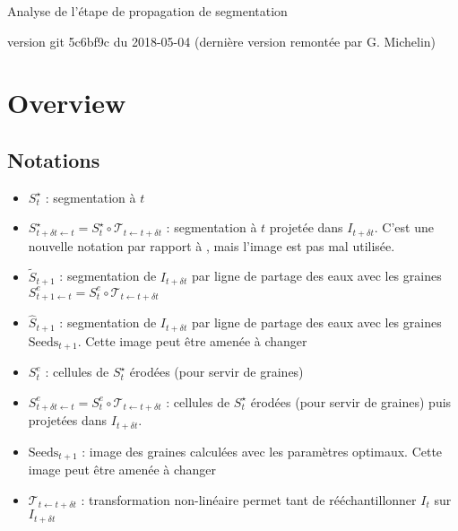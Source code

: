 \documentclass{article}
\begin{document}
Analyse de l'\'etape de propagation de segmentation

version git 5c6bf9c du 2018-05-04 (derni\`ere version remont\'ee par G. Michelin)





\tableofcontents





\pagebreak
\section{Overview}

\subsection{Notations}

\begin{itemize}
\itemsep -0.5ex

\item $S^{\star}_t$ : segmentation \`a $t$

\item $S^{\star}_{t+\delta t \leftarrow t} = S^{\star}_t \circ \mathcal{T}_{t \leftarrow t+\delta t}$ : segmentation \`a $t$ projet\'ee dans $I_{t+\delta t}$. C'est une nouvelle notation par rapport \`a \cite{guignard:tel-01278725}, mais l'image est pas mal utilis\'ee.

\item  $\tilde{S}_{t+1}$ : segmentation de $I_{t + \delta t}$ par ligne de partage des eaux avec les graines $S^e_{t+1 \leftarrow t} = S^e_t \circ \mathcal{T}_{t \leftarrow t+\delta t}$

\item $\hat{S}_{t+1}$ : segmentation de $I_{t + \delta t}$ par ligne de partage des eaux avec les graines $\mathrm{Seeds}_{t+1}$. Cette image peut \^etre amen\'ee \`a changer

\item $S^e_t$ : cellules de $S^{\star}_t$ \'erod\'ees (pour servir de graines)

\item $S^e_{t+\delta t \leftarrow t} = S^e_t \circ \mathcal{T}_{t \leftarrow t+\delta t}$ : cellules de $S^{\star}_t$ \'erod\'ees (pour servir de graines) puis projet\'ees dans $I_{t+\delta t}$.

\item $\mathrm{Seeds}_{t+1}$ : image des graines calcul\'ees avec les param\`etres optimaux. Cette image peut \^etre amen\'ee \`a changer

\item $\mathcal{T}_{t \leftarrow t+\delta t}$ : transformation non-lin\'eaire permet
tant de r\'e\'echantillonner $I_{t}$ sur  $I_{t + \delta t}$
\end{itemize}
\end{document}

